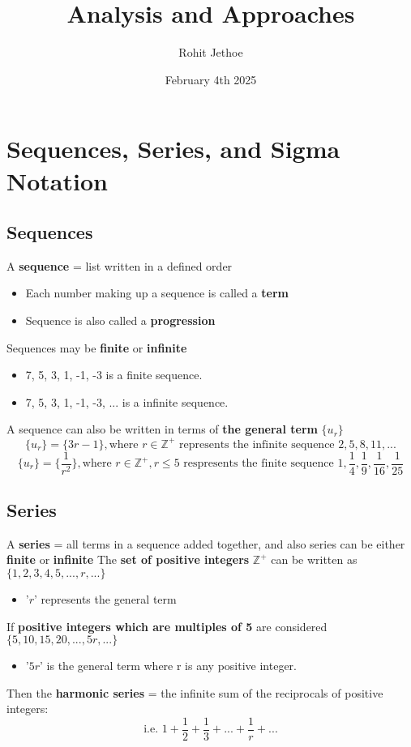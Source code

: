 \documentclass{article}
\title{Analysis and Approaches}
\author{Rohit Jethoe}
\date{February 4th 2025}
\begin{document}
\section{Sequences, Series, and Sigma Notation}
\subsection{Sequences}
A \textbf{sequence} = list written in a defined order
\begin{itemize}
        \item Each number making up a sequence is called a \textbf{term}
        \item Sequence is also called a \textbf{progression}
\end{itemize}
\hfill \break
Sequences may be \textbf{finite} or \textbf{infinite}
\begin{itemize}
        \item 7, 5, 3, 1, -1, -3 is a finite sequence.
        \item 7, 5, 3, 1, -1, -3, ... is a infinite sequence.
\end{itemize}
\hfill \break
A sequence can also be written in terms of \textbf{the general term} $ \{u_r\} $
$$ \{u_r\} = \{3r - 1\}, \text{where }r \in \mathbb{Z}^{+} \text{ represents the infinite sequence } 2,5,8,11, ...$$
$$ \{u_r\} = \{\dfrac{1}{r^2}\}, \text{where } r \in \mathbb{Z}^+, r \leq 5 \text{ respresents the finite sequence } 1,\dfrac{1}{4}, \dfrac{1}{9}, \dfrac{1}{16}, \dfrac{1}{25}$$
\hfill \break
\subsection{Series}
A \textbf{series} = all terms in a sequence added together, and also series can be either \textbf{finite} or \textbf{infinite}
\hfill \break \break
The \textbf{set of positive integers} $ \mathbb{Z}^{+} $ can be written as $ \{1, 2, 3, 4, 5, ..., r, ...\} $
\begin{itemize}
    \item '$r$' represents the general term
\end{itemize}
If \textbf{positive integers which are multiples of 5} are considered $ \{5, 10, 15, 20, ..., 5r, ...\}$
\begin{itemize}
    \item '$5r$' is the general term where r is any positive integer.
\end{itemize}
Then the \textbf{harmonic series} = the infinite sum of the reciprocals of positive integers: 
$$ \text{i.e. } 1 + \dfrac{1}{2} + \dfrac{1}{3} + ... + \dfrac{1}{r} + ...$$
\hfill \break \break
\hfill \break
\end{document}
